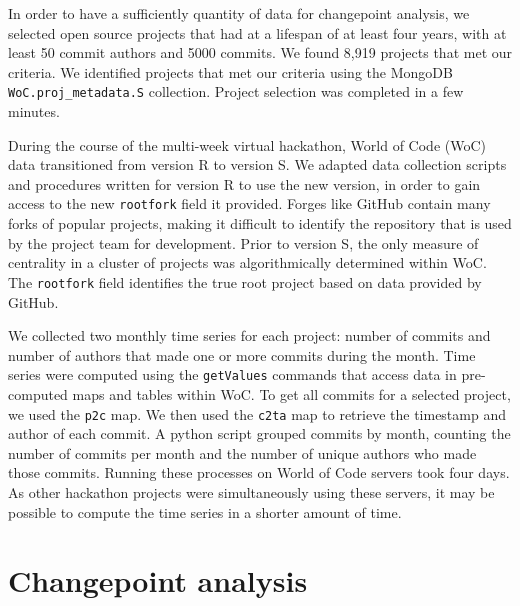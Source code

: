 \documentclass[10pt,conference]{IEEEtran}
\begin{document}
In order to have a sufficiently quantity of data for changepoint analysis, we selected open source projects that had at a lifespan of at least four years, with at least 50 commit authors and 5000 commits. We found 8,919 projects that met our criteria. We identified projects that met our criteria using the MongoDB \texttt{WoC.proj\_metadata.S} collection. Project selection was completed in a few minutes.

During the course of the multi-week virtual hackathon, World of Code (WoC) data transitioned from version R to version S. We adapted data collection scripts and procedures written for version R to use the new version, in order to gain access to the new \texttt{rootfork} field it provided. Forges like GitHub contain many forks of popular projects, making it difficult to identify the repository that is used by the project team for development. Prior to version S, the only measure of centrality in a cluster of projects was algorithmically determined within WoC. The \texttt{rootfork} field identifies the true root project based on data provided by GitHub.

We collected two monthly time series for each project: number of commits and number of authors that made one or more commits during the month. Time series were computed using the \texttt{getValues} commands that access data in pre-computed maps and tables within WoC. To get all commits for a selected project, we used the \texttt{p2c} map. We then used the \texttt{c2ta} map to retrieve the timestamp and author of each commit. A python script grouped commits by month, counting the number of commits per month and the number of unique authors who made those commits. Running these processes on World of Code servers took four days. As other hackathon projects were simultaneously using these servers, it may be possible to compute the time series in a shorter amount of time.


\section{Changepoint analysis}
\end{document}
